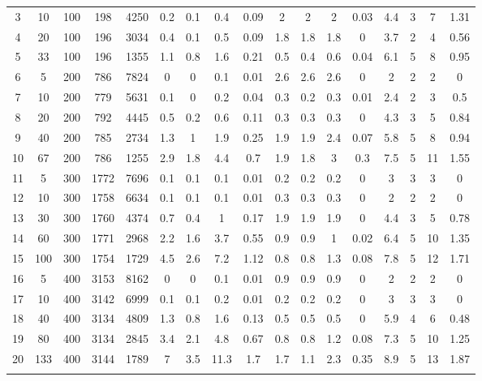 \documentclass[11pt]{article}
\newcommand{\np}{\newpage}
\begin{document}
\begin{appendices}
\begin{landscape}
\begin{longtable}[c]{ccccc|cccc|cccc|cccc}
				3 & 10 & 100 & 198 & 4250 & 0.2 & 0.1 & 0.4 & 0.09 & 2 & 2 & 2 & 0.03 & 4.4 & 3 & 7 & 1.31 \\
				\rowcolor[HTML]{EFEFEF} 
				4 & 20 & 100 & 196 & 3034 & 0.4 & 0.1 & 0.5 & 0.09 & 1.8 & 1.8 & 1.8 & 0 & 3.7 & 2 & 4 & 0.56 \\
				\rowcolor[HTML]{EFEFEF} 
				5 & 33 & 100 & 196 & 1355 & 1.1 & 0.8 & 1.6 & 0.21 & 0.5 & 0.4 & 0.6 & 0.04 & 6.1 & 5 & 8 & 0.95 \\
				6 & 5 & 200 & 786 & 7824 & 0 & 0 & 0.1 & 0.01 & 2.6 & 2.6 & 2.6 & 0 & 2 & 2 & 2 & 0 \\
				7 & 10 & 200 & 779 & 5631 & 0.1 & 0 & 0.2 & 0.04 & 0.3 & 0.2 & 0.3 & 0.01 & 2.4 & 2 & 3 & 0.5 \\
				8 & 20 & 200 & 792 & 4445 & 0.5 & 0.2 & 0.6 & 0.11 & 0.3 & 0.3 & 0.3 & 0 & 4.3 & 3 & 5 & 0.84 \\
				9 & 40 & 200 & 785 & 2734 & 1.3 & 1 & 1.9 & 0.25 & 1.9 & 1.9 & 2.4 & 0.07 & 5.8 & 5 & 8 & 0.94 \\
				10 & 67 & 200 & 786 & 1255 & 2.9 & 1.8 & 4.4 & 0.7 & 1.9 & 1.8 & 3 & 0.3 & 7.5 & 5 & 11 & 1.55 \\
				\rowcolor[HTML]{EFEFEF} 
				11 & 5 & 300 & 1772 & 7696 & 0.1 & 0.1 & 0.1 & 0.01 & 0.2 & 0.2 & 0.2 & 0 & 3 & 3 & 3 & 0 \\
				\rowcolor[HTML]{EFEFEF} 
				12 & 10 & 300 & 1758 & 6634 & 0.1 & 0.1 & 0.1 & 0.01 & 0.3 & 0.3 & 0.3 & 0 & 2 & 2 & 2 & 0 \\
				\rowcolor[HTML]{EFEFEF} 
				13 & 30 & 300 & 1760 & 4374 & 0.7 & 0.4 & 1 & 0.17 & 1.9 & 1.9 & 1.9 & 0 & 4.4 & 3 & 5 & 0.78 \\
				\rowcolor[HTML]{EFEFEF} 
				14 & 60 & 300 & 1771 & 2968 & 2.2 & 1.6 & 3.7 & 0.55 & 0.9 & 0.9 & 1 & 0.02 & 6.4 & 5 & 10 & 1.35 \\
				\rowcolor[HTML]{EFEFEF} 
				15 & 100 & 300 & 1754 & 1729 & 4.5 & 2.6 & 7.2 & 1.12 & 0.8 & 0.8 & 1.3 & 0.08 & 7.8 & 5 & 12 & 1.71 \\
				16 & 5 & 400 & 3153 & 8162 & 0 & 0 & 0.1 & 0.01 & 0.9 & 0.9 & 0.9 & 0 & 2 & 2 & 2 & 0 \\
				17 & 10 & 400 & 3142 & 6999 & 0.1 & 0.1 & 0.2 & 0.01 & 0.2 & 0.2 & 0.2 & 0 & 3 & 3 & 3 & 0 \\
				18 & 40 & 400 & 3134 & 4809 & 1.3 & 0.8 & 1.6 & 0.13 & 0.5 & 0.5 & 0.5 & 0 & 5.9 & 4 & 6 & 0.48 \\
				19 & 80 & 400 & 3134 & 2845 & 3.4 & 2.1 & 4.8 & 0.67 & 0.8 & 0.8 & 1.2 & 0.08 & 7.3 & 5 & 10 & 1.25 \\
				20 & 133 & 400 & 3144 & 1789 & 7 & 3.5 & 11.3 & 1.7 & 1.7 & 1.1 & 2.3 & 0.35 & 8.9 & 5 & 13 & 1.87 \\ \np

\end{longtable}
\end{landscape}
\end{appendices}
\end{document}

